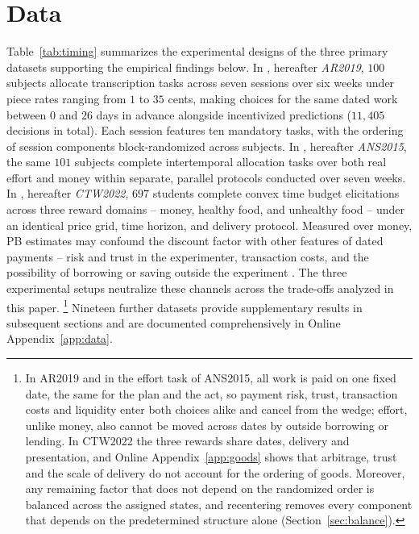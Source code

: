 \documentclass[11pt,a4paper]{article}
\theoremstyle{plain}
\theoremstyle{definition}
\begin{document}
\section{Data}
\label{sec:data}

Table~\ref{tab:timing} summarizes the experimental designs of the three primary datasets supporting the empirical findings below.
In \citet{augenblick2019}, hereafter \textit{AR2019}, $100$ subjects allocate transcription tasks across seven sessions over six weeks under piece rates ranging from $1$ to $35$ cents, making choices for the same dated work between $0$ and $26$ days in advance alongside incentivized predictions ($11{,}405$ decisions in total). Each session features ten mandatory tasks, with the ordering of session components block-randomized across subjects.
In \citet{ans2015}, hereafter \textit{ANS2015}, the same $101$ subjects complete intertemporal allocation tasks over both real effort and money within separate, parallel protocols conducted over seven weeks.
In \citet{cheung2022}, hereafter \textit{CTW2022}, $697$ %
students complete convex time budget elicitations across three reward domains -- money, healthy food, and unhealthy food -- under an identical price grid, time horizon, and delivery protocol.
Measured over money, PB estimates may confound the discount factor with other features of dated payments -- risk and trust in the experimenter, transaction costs, and the possibility of borrowing or saving outside the experiment \citep[e.g.,][]{andreoni2012b,deansautmann2021}. %
The three experimental setups neutralize these channels across the trade-offs analyzed in this paper.
\footnote{In AR2019 and in the effort task of ANS2015, all work is paid on one fixed date, the same for the plan and the act, so payment risk, trust, transaction costs and liquidity enter both choices alike and cancel from the wedge; effort, unlike money, also cannot be moved across dates by outside borrowing or lending. In CTW2022 the three rewards share dates, delivery and presentation, and Online Appendix~\ref{app:goods} shows that arbitrage, trust and the scale of delivery do not account for the ordering of goods. Moreover, any remaining factor that does not depend on the randomized order is balanced across the assigned states, and recentering removes every component that depends on the predetermined structure alone (Section~\ref{sec:balance}).}
Nineteen %
further datasets provide supplementary results in subsequent sections %
and are documented comprehensively in Online Appendix~\ref{app:data}.
\end{document}
